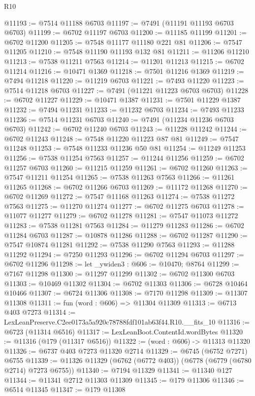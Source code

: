 \begin{lexlean}{R10}
\begin{coremodule}
@11193 := @7514 @11188 @6703
@11197 := @7491 (@11191 @11193 @6703 @6703)
@11199 := @6702 @11197 @6703
@11200 := @11185 @11199
@11201 := @6702 @11200
@11205 := @7548 @11177 @11180 @221 @81
@11206 := @7547 @11205
@11210 := @7548 @11190 @11193 @132 @81
@11211 := @11206 @11210
@11213 := @7538 @11211 @7563
@11214 := @11201 @11213
@11215 := @6702 @11214
@11216 := @10471 @1369
@11218 := @7501 @11216 @1369
@11219 := @7494 @11218
@11220 := @11219 @6703
@11221 := @7493 @11220
@11223 := @7514 @11218 @6703
@11227 := @7491 (@11221 @11223 @6703 @6703)
@11228 := @6702 @11227
@11229 := @10471 @1387
@11231 := @7501 @11229 @1387
@11232 := @7494 @11231
@11233 := @11232 @6703
@11234 := @7493 @11233
@11236 := @7514 @11231 @6703
@11240 := @7491 (@11234 @11236 @6703 @6703)
@11242 := @6702 @11240 @6703
@11243 := @11228 @11242
@11244 := @6702 @11243
@11248 := @7548 @11220 @11223 @87 @81
@11249 := @7547 @11248
@11253 := @7548 @11233 @11236 @50 @81
@11254 := @11249 @11253
@11256 := @7538 @11254 @7563
@11257 := @11244 @11256
@11259 := @6702 @11257 @6703
@11260 := @11215 @11259
@11261 := @6702 @11260
@11263 := @7547 @11211 @11254
@11265 := @7538 @11263 @7563
@11266 := @11261 @11265
@11268 := @6702 @11266 @6703
@11269 := @11172 @11268
@11270 := @6702 @11269
@11272 := @7547 @11168 @11263
@11274 := @7538 @11272 @7563
@11275 := @11270 @11274
@11277 := @6702 @11275 @6703
@11278 := @11077 @11277
@11279 := @6702 @11278
@11281 := @7547 @11073 @11272
@11283 := @7538 @11281 @7563
@11284 := @11279 @11283
@11286 := @6702 @11284 @6703
@11287 := @10878 @11286
@11288 := @6702 @11287
@11290 := @7547 @10874 @11281
@11292 := @7538 @11290 @7563
@11293 := @11288 @11292
@11294 := @7250 @11293
@11296 := @6702 @11294 @6703
@11297 := @6702 @11296
@11298 := let _ywiden3 : @606 := @10470; @8764
@11299 := @7167 @11298
@11300 := @11297 @11299
@11302 := @6702 @11300 @6703
@11303 := @10469 @11302
@11304 := @6702 @11303
@11306 := @6728 @10464 @10466
@11307 := @6724 @11306
@11308 := @7170 @11298
@11309 := @11307 @11308
@11311 := fun (word : @606) => @11304 @11309
@11313 := @6713 @403 @7273
@11314 := LexLeanPreserve.C2ee0173a5a920c78788fdf101ab63f44.R10.__fits_10
@11316 := @6723 (@11314 @6516)
@11317 := LexLeanBoot.ContentId.wordBytes
@11320 := @11316 (@179 (@11317 @6516))
@11322 := (word : @606) -> @11313 @11320
@11326 := @6737 @403 @7273 @11320 @2714
@11329 := @6745 (@6752 @7271) @6755
@11339 := @11326 @11329 (@6762 (@6772 @403)) (@6778 (@6779 (@6780 @2714) @7273 @6755))
@11340 := @7194 @11329
@11341 := @11340 @127
@11344 := @11341 @2712 @11303 @11309
@11345 := @179 @11306
@11346 := @6514 @11345
@11347 := @179 @11308

\end{coremodule}
\end{lexlean}
